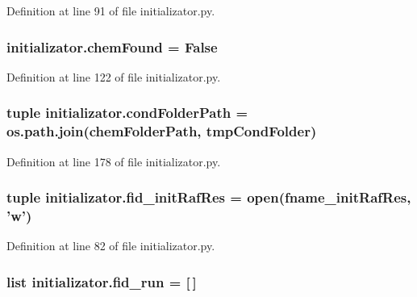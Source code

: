 Definition at line 91 of file initializator.\+py.

\hypertarget{a00137_acdd521d6bd1a71be37421dafd210de99}{
\subsubsection[{chem\+Found}]{\setlength{\rightskip}{0pt plus 5cm}initializator.\+chem\+Found = False}}\label{a00137_acdd521d6bd1a71be37421dafd210de99}


Definition at line 122 of file initializator.\+py.

\hypertarget{a00137_a7fe46587523066ae019cbe755f63888a}{
\subsubsection[{cond\+Folder\+Path}]{\setlength{\rightskip}{0pt plus 5cm}tuple initializator.\+cond\+Folder\+Path = os.\+path.\+join({\bf chem\+Folder\+Path}, {\bf tmp\+Cond\+Folder})}}\label{a00137_a7fe46587523066ae019cbe755f63888a}


Definition at line 178 of file initializator.\+py.

\hypertarget{a00137_a2f15742bdb2c2cebe65c8e9730915e28}{
\subsubsection[{fid\+\_\+init\+Raf\+Res}]{\setlength{\rightskip}{0pt plus 5cm}tuple initializator.\+fid\+\_\+init\+Raf\+Res = open({\bf fname\+\_\+init\+Raf\+Res}, 'w')}}\label{a00137_a2f15742bdb2c2cebe65c8e9730915e28}


Definition at line 82 of file initializator.\+py.

\hypertarget{a00137_a6015a676cc06fdae98b1cca15d92b883}{
\subsubsection[{fid\+\_\+run}]{\setlength{\rightskip}{0pt plus 5cm}list initializator.\+fid\+\_\+run = \mbox{[}$\,$\mbox{]}}}\label{a00137_a6015a676cc06fdae98b1cca15d92b883}


